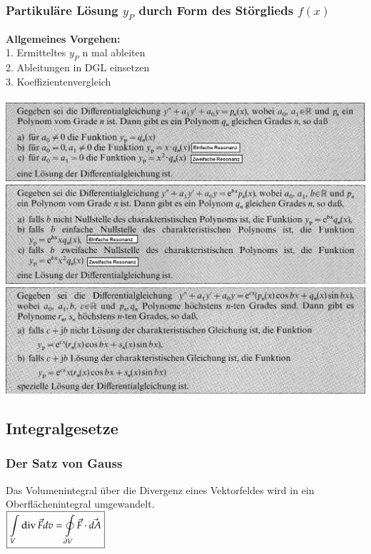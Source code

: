 \subsubsection{Partikuläre Lösung $y_P$ durch Form des Störglieds $f(x)$}
\textbf{Allgemeines Vorgehen:}\\
1. Ermitteltes $y_P$ n mal ableiten \\
2. Ableitungen in DGL einsetzen \\
3. Koeffizientenvergleich \\
\vspace{0.2cm}\\
\includegraphics[width=\linewidth]{images/DGL_Part_1.jpg}
\includegraphics[width=\linewidth]{images/DGL_Part_2.jpg}
\includegraphics[width=\linewidth]{images/DGL_Part_3.jpg}
\clearpage
\pagebreak

\subsection{Integralgesetze}
\subsubsection{Der Satz von Gauss}
Das Volumenintegral über die Divergenz eines Vektorfeldes wird in ein Oberflächenintegral umgewandelt.\\
$\boxed{\int\limits_V \operatorname{div} \vec F dv = \oint\limits_{\partial V} \vec F \cdot \vec{dA}}$
